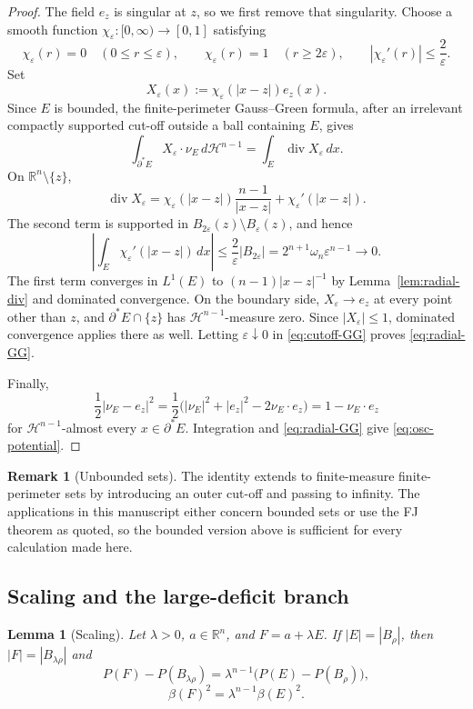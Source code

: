 \documentclass[11pt]{amsart}
\newtheorem{lemma}[theorem]{Lemma}
\theoremstyle{definition}
\newtheorem{remark}[theorem]{Remark}
\newcommand{\R}{\mathbb R}
\newcommand{\Hn}{\mathcal H^{n-1}}
\newcommand{\eps}{\varepsilon}
\newcommand{\Per}{P}
\begin{document}
\begin{proof}
The field \(e_z\) is singular at \(z\), so we first remove that singularity.
Choose a smooth function \(\chi_\eps:[0,\infty)\to[0,1]\) satisfying
\[
   \chi_\eps(r)=0\quad (0\le r\le\eps),\qquad
   \chi_\eps(r)=1\quad (r\ge2\eps),\qquad
   |\chi_\eps'(r)|\le\frac{2}{\eps}.
\]
Set
\[
   X_\eps(x):=\chi_\eps(|x-z|)e_z(x).
\]
Since \(E\) is bounded, the finite-perimeter Gauss--Green formula, after an
irrelevant compactly supported cut-off outside a ball containing \(E\), gives
\[
   \int_{\partial^*E}X_\eps\cdot\nu_E\,d\Hn
   =\int_E\operatorname{div}X_\eps\,dx.
\tag{2.4}\label{eq:cutoff-GG}
\]
On \(\R^n\setminus\{z\}\),
\[
   \operatorname{div}X_\eps
   =\chi_\eps(|x-z|)\frac{n-1}{|x-z|}
     +\chi_\eps'(|x-z|).
\]
The second term is supported in
\(B_{2\eps}(z)\setminus B_\eps(z)\), and hence
\[
   \left|\int_E\chi_\eps'(|x-z|)\,dx\right|
   \le \frac2\eps |B_{2\eps}|
   =2^{n+1}\omega_n\eps^{n-1}\longrightarrow0.
\]
The first term converges in \(L^1(E)\) to
\((n-1)|x-z|^{-1}\) by Lemma~\ref{lem:radial-div} and dominated convergence.
On the boundary side, \(X_\eps\to e_z\) at every point other than \(z\), and
\(\partial^*E\cap\{z\}\) has \(\Hn\)-measure zero.  Since
\(|X_\eps|\le1\), dominated convergence applies there as well.  Letting
\(\eps\downarrow0\) in \eqref{eq:cutoff-GG} proves
\eqref{eq:radial-GG}.

Finally,
\[
   \frac12|\nu_E-e_z|^2
   =\frac12\bigl(|\nu_E|^2+|e_z|^2-2\nu_E\cdot e_z\bigr)
   =1-\nu_E\cdot e_z
\]
for \(\Hn\)-almost every \(x\in\partial^*E\).  Integration and
\eqref{eq:radial-GG} give \eqref{eq:osc-potential}.
\end{proof}

\begin{remark}[Unbounded sets]\label{rem:unbounded}
The identity extends to finite-measure finite-perimeter sets by introducing an
outer cut-off and passing to infinity.  The applications in this manuscript
either concern bounded sets or use the FJ theorem as quoted, so the bounded
version above is sufficient for every calculation made here.
\end{remark}

\subsection{Scaling and the large-deficit branch}

\begin{lemma}[Scaling]\label{lem:scaling}
Let \(\lambda>0\), \(a\in\R^n\), and \(F=a+\lambda E\).  If
\(|E|=|B_\rho|\), then \(|F|=|B_{\lambda\rho}|\) and
\[
   \Per(F)-\Per(B_{\lambda\rho})
      =\lambda^{n-1}\bigl(\Per(E)-\Per(B_\rho)\bigr),
\tag{2.5}\label{eq:scale-D}
\]
\[
   \beta(F)^2=\lambda^{n-1}\beta(E)^2.
\tag{2.6}\label{eq:scale-beta}
\]
\end{lemma}
\end{document}
